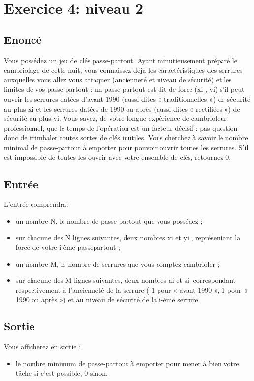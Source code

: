 \documentclass{article}
\begin{document}
    \section{Exercice 4: niveau 2}
        \subsection{Enoncé}
            Vous possédez un jeu de clés passe-partout. Ayant minutieusement préparé le cambriolage de cette nuit,
            vous connaissez déjà les caractéristiques des serrures auxquelles vous allez vous attaquer (ancienneté et niveau
            de sécurité) et les limites de vos passe-partout : un passe-partout est dit de force (xi
            , yi) s’il peut ouvrir les
            serrures datées d’avant 1990 (aussi dites « traditionnelles ») de sécurité au plus xi et les serrures datées de
            1990 ou après (aussi dites « rectifiées ») de sécurité au plus yi.
            Vous savez, de votre longue expérience de cambrioleur professionnel, que le temps de l’opération est un
            facteur décisif : pas question donc de trimbaler toutes sortes de clés inutiles. Vous cherchez à savoir le nombre
            minimal de passe-partout à emporter pour pouvoir ouvrir toutes les serrures. S’il est impossible de toutes les
            ouvrir avec votre ensemble de clés, retournez 0.
        
        \subsection{Entrée}
            L'entrée comprendra:
            \begin{itemize}
                \item un nombre N, le nombre de passe-partout que vous possédez ;
                \item sur chacune des N lignes suivantes, deux nombres xi et yi , représentant la force de votre i-ème passepartout ;
                \item un nombre M, le nombre de serrures que vous comptez cambrioler ;
                \item sur chacune des M lignes suivantes, deux nombres ai et si, correspondant respectivement à l’ancienneté de la serrure (-1 pour « avant 1990 », 1 pour « 1990 ou après ») et au niveau de sécurité de la i-ème serrure.
            \end{itemize}
        
        \subsection{Sortie}
            Vous afficherez en sortie :
            \begin{itemize}
                \item le nombre minimum de passe-partout à emporter pour mener à bien votre tâche si c’est possible, 0 sinon.
            \end{itemize}
\end{document}
